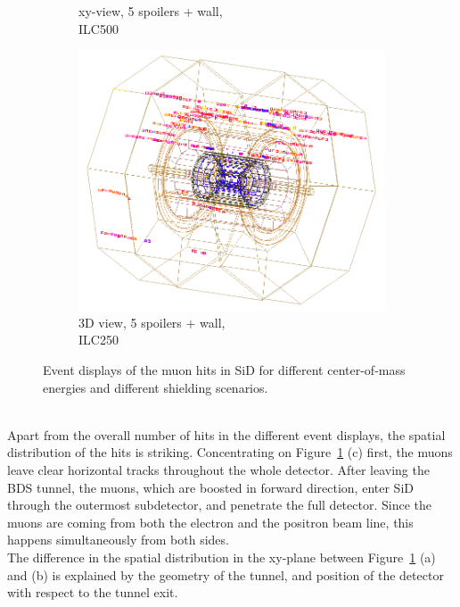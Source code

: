 \begin{figure}[htbp]
\begin{subfigure}[b]{0.31\textwidth}
   \caption{xy-view, 5 spoilers + wall,\\ILC500}
   \end{subfigure}
   \hfill
    \begin{subfigure}[b]{0.31\textwidth}
   \centering
    \includegraphics[width=\textwidth]{Figures/BDS_muons/Event_display_ILC250_p_spoilers_wall_inverted.png}
   \caption{3D view, 5 spoilers + wall,\\ILC250}
   \end{subfigure}
   \caption[Event displays of BDS muons in SiD]{Event displays of the muon hits in SiD for different center-of-mass energies and different shielding scenarios.}
   \label{fig:BDS_Muons:wired4}
 \end{figure}
\\Apart from the overall number of hits in the different event displays, the spatial distribution of the hits is striking.
Concentrating on Figure~\ref{fig:BDS_Muons:wired4} (c) first, the muons leave clear horizontal tracks throughout the whole detector.
After leaving the BDS tunnel, the muons, which are boosted in forward direction, enter SiD through the outermost subdetector, and penetrate the full detector.
Since the muons are coming from both the electron and the positron beam line, this happens simultaneously from both sides.
\\The difference in the spatial distribution in the xy-plane between Figure~\ref{fig:BDS_Muons:wired4} (a) and (b) is explained by the geometry of the tunnel, and position of the detector with respect to the tunnel exit.
